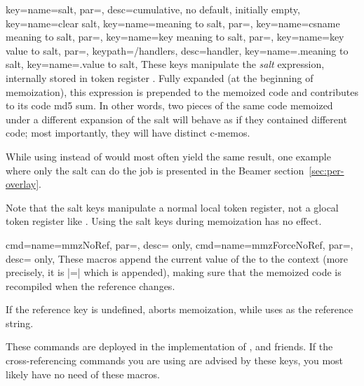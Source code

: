 \documentclass[a4paper,11pt]{article}
\begin{document}
\begin{doc}{
    key={name=salt, par=, desc={cumulative, no default,
        initially empty}},
    key={name=clear salt},
    key={name=meaning to salt,
      par=},
    key={name=csname meaning to salt, par=},
    key={name=key meaning to salt,
      par=},
    key={name=key value to salt,
      par=},
    keypath={/handlers}, desc=handler,
    key={name=.meaning to salt},
    key={name=.value to salt},
  }
  These keys manipulate the \emph{salt} expression, internally stored in token
  register .  Fully expanded (at the beginning of
  memoization), this expression is prepended to the memoized code and
  contributes to its code md5 sum.  In other words, two pieces of the same code
  memoized under a different expansion of the salt will behave as if they
  contained different code; most importantly, they will have distinct c-memos.

  While using  instead of  would most often yield
  the same result, one example where only the salt can do the job is presented
  in the Beamer section~\ref{sec:per-overlay}.

  Note that the salt keys manipulate a normal local token register, not a
  glocal token register like .  Using the salt keys during
  memoization has no effect.
\end{doc}

\begin{doc}{
    cmd={name=mmzNoRef, par=, desc= only},
    cmd={name=mmzForceNoRef, par=, desc= only},
  }
  These macros append the current value of the  to the
  context (more precisely, it is |=|
  which is appended), making sure that the memoized code is recompiled when the
  reference changes.

  If the reference key is undefined,  aborts memoization,
  while  uses  as the reference string.

  These commands are deployed in the implementation of ,  and friends.  If the
  cross-referencing commands you are using are advised by these keys, you most
  likely have no need of these macros.
\end{doc}
\end{document}

